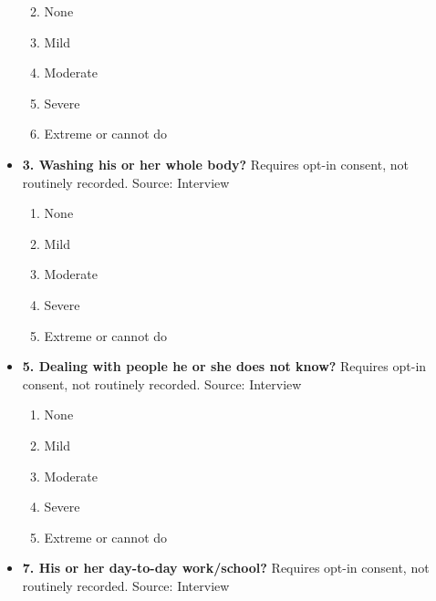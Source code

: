 \documentclass[
]{scrartcl}
\providecommand{\tightlist}{%
  \setlength{\itemsep}{0pt}\setlength{\parskip}{0pt}}\usepackage{longtable,booktabs,array}
\begin{document}
\begin{itemize}
  \begin{enumerate}
  \def\labelenumi{\arabic{enumi}.}
  \tightlist
  \item
    None
  \item
    Mild
  \item
    Moderate
  \item
    Severe
  \item
    Extreme or cannot do
  \end{enumerate}
\item
  \textbf{3. Washing his or her whole body?} Requires opt-in consent,
  not routinely recorded. Source: Interview

  \begin{enumerate}
  \def\labelenumi{\arabic{enumi}.}
  \tightlist
  \item
    None
  \item
    Mild
  \item
    Moderate
  \item
    Severe
  \item
    Extreme or cannot do
  \end{enumerate}
\item
  \textbf{5. Dealing with people he or she does not know?} Requires
  opt-in consent, not routinely recorded. Source: Interview

  \begin{enumerate}
  \def\labelenumi{\arabic{enumi}.}
  \tightlist
  \item
    None
  \item
    Mild
  \item
    Moderate
  \item
    Severe
  \item
    Extreme or cannot do
  \end{enumerate}
\item
  \textbf{7. His or her day-to-day work/school?} Requires opt-in
  consent, not routinely recorded. Source: Interview


\end{itemize}
\end{document}
